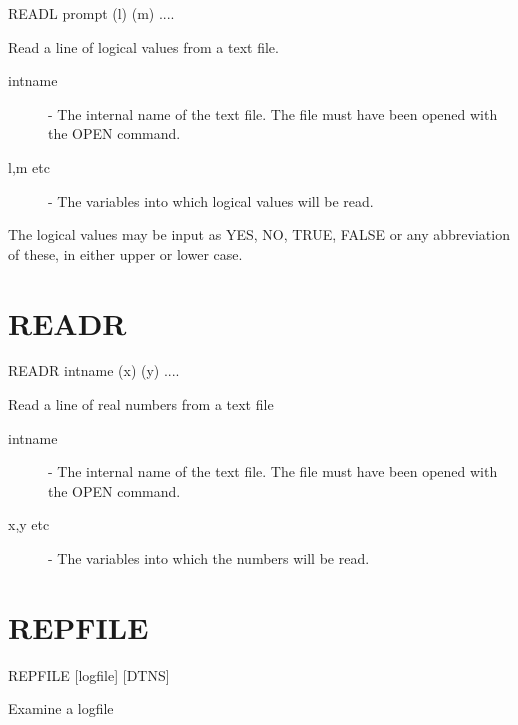 \documentclass[twoside,11pt,nolof,chapters]{starlink}
\begin{document}
    READL \hspace{.5cm} prompt \hspace{.5cm} (l) \hspace{.5cm} (m)  ....

 Read a line of logical values from a text file.

\begin{description}

\item[intname]  -  The internal name of the text file. The file must have
                   been opened with the OPEN command.

\item[l,m etc] -  The variables into which logical values will be read.

\end{description}
The logical values may be input as YES, NO, TRUE, FALSE or any
abbreviation of these, in either upper or lower case.


\section{READR\label{READR}}

    READR \hspace{.5cm} intname \hspace{.5cm} (x) \hspace{.5cm} (y)  ....

 Read a line of real numbers from a text file

\begin{description}

\item[intname]  -  The internal name of the text file. The file must have
                   been opened with the OPEN command.

\item[x,y etc] -  The variables into which the numbers will be read.

\end{description}


\section{REPFILE\label{REPFILE}}

    REPFILE \hspace{.5cm} [logfile] \hspace{.5cm} [DTNS]

Examine a logfile
\end{document}
